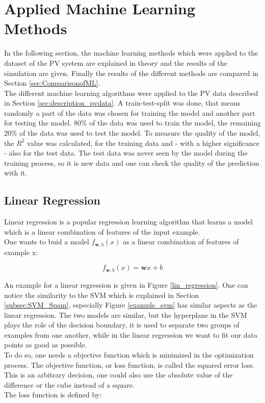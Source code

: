 \section{Applied Machine Learning Methods}

In the following section, the machine learning methods which were applied to the dataset of the PV system are explained in theory and the results of the simulation are given. Finally the results of the different methods are compared in Section \ref{sec:ComparisonofML}.  \\
The different machine learning algorithms were applied to the PV data described in Section \ref{sec:description_pvdata}. A train-test-split was done, that means randomly a part of the data was chosen for training the model and another part for testing the model. 80\% of the data was used to train the model, the remaining 20\% of the data was used to test the model. To measure the quality of the model, the $R^{2}$ value was calculated, for the training data and - with a higher significance - also for the test data. The test data was never seen by the model during the training process, so it is new data and one can check the quality of the prediction with it.


\subsection{Linear Regression}

Linear regression is a popular regression learning algorithm that learns a model which is a linear combination of features of the input example. \\
One wants to buid a model $f_{\textbf{w},b}(x)$ as a linear combination of features of example x: 

\begin{equation}
\label{eq:linregression}
	f_{\textbf{w},b}(x) = \textbf{w} x + b
\end{equation}


An example for a linear regression is given in Figure \ref{lin_regression}. One can notice the similarity to the SVM which is explained in Section \ref{subsec:SVM_Spam}, especially Figure \ref{example_svm} has similar aspects as the linear regression.  The two models are similar, but the hyperplane in the SVM plays the role of the decision boundary, it is used to separate two groups of examples from one another, while in the linear regression we want to fit our data points as good as possible. \\
To do so, one needs a objective function which is minimized in the optimization process. The objective function, or loss function, is called the squared error loss. This is an arbitrary decision, one could also use the absolute value of the difference or the cube instead of a square. \\
The loss function is defined by: 

